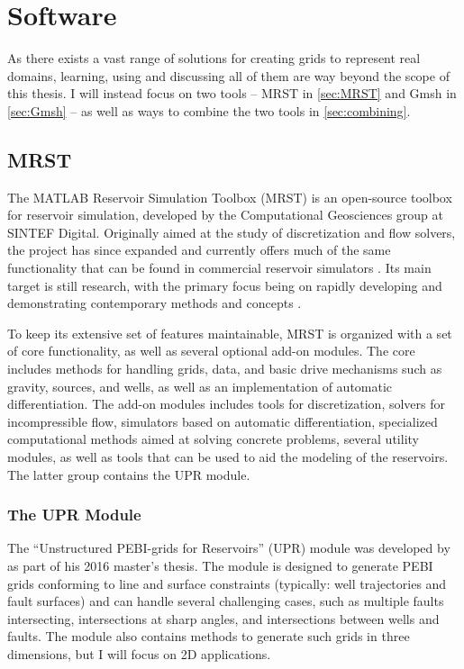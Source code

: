 \section{Software}
\label{sec:Software}
As there exists a vast range of solutions for creating grids to represent real domains, learning, using and discussing all of them are way beyond the scope of this thesis. I will instead focus on two tools -- MRST in \autoref{sec:MRST} and Gmsh in \autoref{sec:Gmsh} -- as well as ways to combine the two tools in \autoref{sec:combining}. 

\subsection{MRST}
\label{sec:MRST}
The MATLAB Reservoir Simulation Toolbox (MRST) is an open-source toolbox for reservoir simulation, developed by the Computational Geosciences group at SINTEF Digital. Originally aimed at the study of discretization and flow solvers, the project has since expanded and currently offers much of the same functionality that can be found in commercial reservoir simulators \cite{MRST_book}. Its main target is still research, with the primary focus being on rapidly developing and demonstrating contemporary methods and concepts \cite{MRST_website}.

To keep its extensive set of features maintainable, MRST is organized with a set of core functionality, as well as several optional add-on modules. The core includes methods for handling grids, data, and basic drive mechanisms such as gravity, sources, and wells, as well as an implementation of automatic differentiation. The add-on modules includes tools for discretization, solvers for incompressible flow, simulators based on automatic differentiation, specialized computational methods aimed at solving concrete problems, several utility modules, as well as tools that can be used to aid the modeling of the reservoirs. The latter group contains the UPR module.


\subsubsection{The UPR Module}
\label{sec:UPR}
The ``Unstructured PEBI-grids for Reservoirs'' (UPR) module was developed by \textcite{UPR_thesis} as part of his 2016 master's thesis. The module is designed to generate PEBI grids conforming to line and surface constraints (typically: well trajectories and fault surfaces) and can handle several challenging cases, such as multiple faults intersecting, intersections at sharp angles, and intersections between wells and faults. The module also contains methods to generate such grids in three dimensions, but I will focus on 2D applications.

